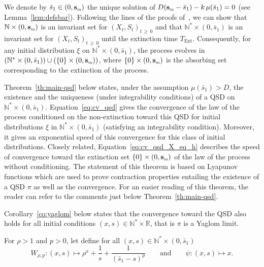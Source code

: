 \documentclass[10pt]{amsart}
\theoremstyle{definition}\newtheorem{defi}[theo]{Definition}\newtheorem{rema}[theo]{Remark}\newtheorem{exam}[theo]{Example}\newtheorem{exem}[theo]{Example}\newtheorem{nota}[theo]{Notation}
\newcommand{\RR}{\mathbb{R}}
\newcommand{\NN}{\mathbb{N}}
\newcommand{\Sin}{{\mathbf s}_{\textrm{\tiny\rm in}}}
\newcommand{\X}{\NN^* \times (0,\bar s_1)}
\newcommand{\Text}{T_{\mathrm{Ext}}}
\newcommand{\1}{\mathbf{1}}
\begin{document}
We denote by $\bar s_1\in(0,\Sin)$ the unique solution of $D(\Sin-\bar s_1)-k\,\mu(\bar s_1) = 0$ (see Lemma~\ref{lem:defsbar}). Following the lines of the proofs of~\cite[Proposition~2.1 and Corollary~3.1]{CMMS}, we can show that $\NN\times (0,\Sin)$ is an invariant set for $(X_t,S_t)_{t\,\geq\,0}$ and that $\NN^*\times (0,\bar s_1)$ is an invariant set for $(X_t,S_t)_{t\,\geq\,0}$ until the extinction time $\Text$. Consequently, for any initial distribution $\xi$ on $\NN^*\times (0, \bar s_1)$, the process evolves in $(\X)\cup (\{0\}\times (0,\Sin))$, where $\{0\}\times (0,\Sin)$ is the absorbing set corresponding to the extinction of the process.



Theorem~\ref{th:main-qsd} below states, under the assumption $\mu(\bar s_1)>D$, the existence and the uniqueness (under integrability conditions) of a QSD on $\NN^*\times (0,\bar s_1)$. Equation~\eqref{eq:cv_qsd} gives the convergence of the law of the process conditioned on the non-extinction toward this QSD for initial distributions $\xi$ in $\NN^*\times (0,\bar s_1)$ (satisfying an integrability condition). Moreover, it gives an exponential speed of this convergence for this class of initial distributions. Closely related, Equation~\eqref{eq:cv_qsd_X_eq_h} describes the speed of convergence toward the extinction set $\{0\}\times (0,\Sin)$ of the law of the process without conditioning. The statement of this theorem is based on Lyapunov functions which are used to prove contraction properties entailing the existence of a QSD $\pi$ as well as the convergence. For an easier reading of this theorem, the reader can refer to the comments just below Theorem~\ref{th:main-qsd}.

Corollary~\ref{co:yaglom} below states that the convergence toward the QSD also holds for all initial conditions $(x,s) \in \NN^*\times \RR$, that is $\pi$ is a Yaglom limit.




For $\rho>1$ and $p>0$, let define for all $(x,s)\in \NN^*\times (0,\bar s_1)$
\[
W_{\rho,p}:(x,s) \mapsto \rho^x + \frac{1}{s}+ \frac{1}{(\bar s_1-s)^{p}}\qquad \text{and} \qquad \psi: (x,s) \mapsto x.
\]
\end{document}
